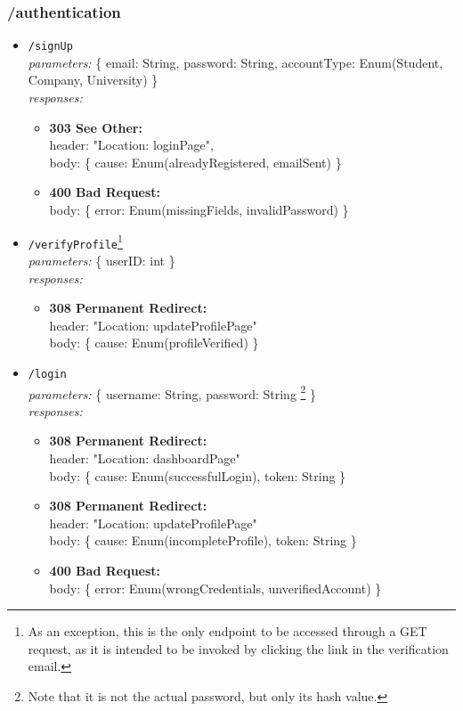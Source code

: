\subsubsection*{/authentication}
\begin{itemize}
    \item \texttt{/signUp} \\
        \textit{parameters:} \{ email: String, password: String, accountType: Enum(Student, Company, University) \} \\
        \textit{responses:}
        \begin{itemize}
            \item \textbf{303 See Other:} \\ 
            header: "Location: loginPage", \\
            body: \{ cause: Enum(alreadyRegistered, emailSent) \}
            \item \textbf{400 Bad Request:} \\
            body: \{ error: Enum(missingFields, invalidPassword) \}
        \end{itemize}
    \item \texttt{/verifyProfile}\footnote{As an exception, this is the only endpoint to be accessed through a GET request, as it is intended to be invoked by clicking the link in the verification email.} \\
        \textit{parameters:} \{ userID: int \} \\
        \textit{responses:} 
        \begin{itemize}
            \item \textbf{308 Permanent Redirect:} \\
            header: "Location: updateProfilePage" \\
            body: \{ cause: Enum(profileVerified) \}
        \end{itemize}
    \item \texttt{/login} \\
        \textit{parameters:} \{ username: String, password: String \footnote{Note that it is not the actual password, but only its hash value.} \}\\
        \textit{responses:}
        \begin{itemize}
            \item \textbf{308 Permanent Redirect:} \\
            header: "Location: dashboardPage" \\
            body: \{ cause: Enum(successfulLogin), token: String \}
            \item \textbf{308 Permanent Redirect:} \\
            header: "Location: updateProfilePage" \\
            body: \{ cause: Enum(incompleteProfile), token: String \}
            \item \textbf{400 Bad Request:} \\
            body: \{ error: Enum(wrongCredentials, unverifiedAccount) \}
        \end{itemize}
\end{itemize}

